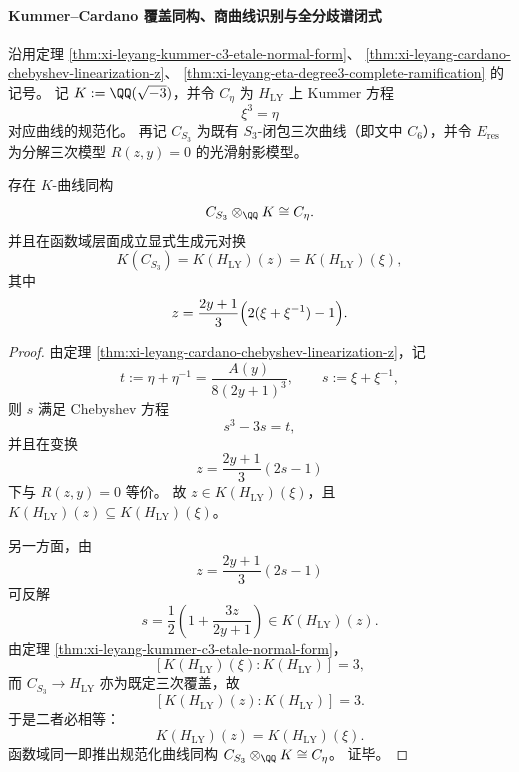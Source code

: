 \paragraph{Kummer--Cardano 覆盖同构、商曲线识别与全分歧谱闭式}
沿用定理 \ref{thm:xi-leyang-kummer-c3-etale-normal-form}、
\ref{thm:xi-leyang-cardano-chebyshev-linearization-z}、
\ref{thm:xi-leyang-eta-degree3-complete-ramification} 的记号。
记 \(K:=\QQ(\sqrt{-3})\)，并令 \(C_\eta\) 为 \(H_{\mathrm{LY}}\) 上 Kummer 方程
\[
\xi^3=\eta
\]
对应曲线的规范化。
再记 \(C_{S_3}\) 为既有 \(S_3\)-闭包三次曲线（即文中 \(C_6\)），并令 \(E_{\mathrm{res}}\) 为分解三次模型 \(R(z,y)=0\) 的光滑射影模型。

\begin{conclusion}\label{con:xi-leyang-kummer-cardano-covering-isomorphism}
存在 \(K\)-曲线同构
\[
C_{S_3}\otimes_{\QQ}K\cong C_\eta.
\]
并且在函数域层面成立显式生成元对换
\[
K(C_{S_3})=K(H_{\mathrm{LY}})(z)=K(H_{\mathrm{LY}})(\xi),
\]
其中
\[
z=\frac{2y+1}{3}\Bigl(2(\xi+\xi^{-1})-1\Bigr).
\]
\end{conclusion}
\begin{proof}
由定理 \ref{thm:xi-leyang-cardano-chebyshev-linearization-z}，记
\[
t:=\eta+\eta^{-1}=\frac{A(y)}{8(2y+1)^3},
\qquad
s:=\xi+\xi^{-1},
\]
则 \(s\) 满足 Chebyshev 方程
\[
s^3-3s=t,
\]
并且在变换
\[
z=\frac{2y+1}{3}(2s-1)
\]
下与 \(R(z,y)=0\) 等价。
故 \(z\in K(H_{\mathrm{LY}})(\xi)\)，且 \(K(H_{\mathrm{LY}})(z)\subseteq K(H_{\mathrm{LY}})(\xi)\)。

另一方面，由
\[
z=\frac{2y+1}{3}(2s-1)
\]
可反解
\[
s=\frac12\left(1+\frac{3z}{2y+1}\right)\in K(H_{\mathrm{LY}})(z).
\]
由定理 \ref{thm:xi-leyang-kummer-c3-etale-normal-form}，
\[
[K(H_{\mathrm{LY}})(\xi):K(H_{\mathrm{LY}})]=3,
\]
而 \(C_{S_3}\to H_{\mathrm{LY}}\) 亦为既定三次覆盖，故
\[
[K(H_{\mathrm{LY}})(z):K(H_{\mathrm{LY}})]=3.
\]
于是二者必相等：
\[
K(H_{\mathrm{LY}})(z)=K(H_{\mathrm{LY}})(\xi).
\]
函数域同一即推出规范化曲线同构
\(
C_{S_3}\otimes_{\QQ}K\cong C_\eta
\)。
证毕。
\end{proof}

